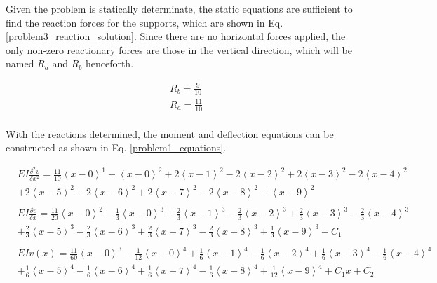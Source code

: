 \documentclass[a4paper]{article}
\begin{document}
Given the problem is statically determinate, the static equations are sufficient to find the reaction forces for the supports, which are shown in Eq. \ref{problem3_reaction_solution}. Since there are no horizontal forces applied, the only non-zero reactionary forces are those in the vertical direction, which will be named $R_a$ and $R_b$ henceforth.

\begin{equation}
\begin{split}
	& R_b = \frac{9}{10} \\
	& R_a = \frac{11}{10} \\
\end{split}
\label{problem3_reaction_solution}
\end{equation}

With the reactions determined, the moment and deflection equations can be constructed as shown in Eq. \ref{problem1_equations}.

\begin{equation}
    \begin{split}
& EI \frac{\delta^2 v}{\delta x^2} = \frac{11}{10}\left<x-0\right>^1 - \left<x-0\right>^2 +  2\left<x-1\right>^2 - 2\left<x-2\right>^2 +  2\left<x-3\right>^2 - 2\left<x-4\right>^2  \\
& +  2\left<x-5\right>^2 - 2\left<x-6\right>^2  +  2\left<x-7\right>^2 - 2\left<x-8\right>^2 + \left <x-9\right>^2 \\
& \\
& EI \frac{\delta v}{\delta x} =  \frac{11}{20}\left<x-0\right>^2 - \frac{1}{3}\left<x-0\right>^3 +  \frac{2}{3}\left<x-1\right>^3 - \frac{2}{3}\left<x-2\right>^3 +  \frac{2}{3}\left<x-3\right>^3 - \frac{2}{3}\left<x-4\right>^3 \\
&  +  \frac{2}{3}\left<x-5\right>^3 - \frac{2}{3}\left<x-6\right>^3  +  \frac{2}{3}\left<x-7\right>^3 - \frac{2}{3}\left<x-8\right>^3 +  \frac{1}{3}\left<x-9\right>^3 + C_1\\
& \\
& EI v(x) = \frac{11}{60}\left<x-0\right>^3 - \frac{1}{12}\left<x-0\right>^4 +  \frac{1}{6}\left<x-1\right>^4 - \frac{1}{6}\left<x-2\right>^4 + \frac{1}{6}\left<x-3\right>^4 - \frac{1}{6}\left<x-4\right>^4  \\      
& +  \frac{1}{6}\left<x-5\right>^4 - \frac{1}{6}\left<x-6\right>^4  +  \frac{1}{6}\left<x-7\right>^4 - \frac{1}{6}\left<x-8\right>^4 +  \frac{1}{12}\left<x-9\right>^4 + C_1x + C_2 \\
    \end{split}
\label{problem1_equations}
\end{equation}
\end{document}
